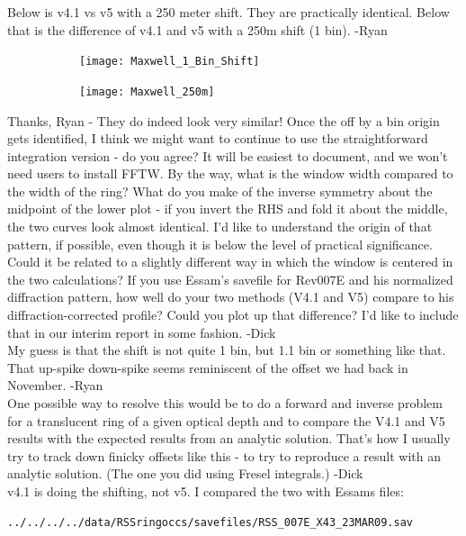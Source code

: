 \documentclass[crop=false,class=article,oneside]{standalone}
\begin{document}
Below is v4.1 vs v5 with a 250 meter shift. They are practically identical. Below that is the difference of v4.1 and v5 with a 250m shift (1 bin). -Ryan
\begin{figure}[H]
    \centering
    \begin{subfigure}[b]{0.49\textwidth}
        \texttt{[image: Maxwell\_1\_Bin\_Shift]}
    \end{subfigure}
        \begin{subfigure}[b]{0.49\textwidth}
        \texttt{[image: Maxwell\_250m]}
    \end{subfigure}
\end{figure}
Thanks, Ryan - They do indeed look very similar! Once the off by a bin origin gets identified, I think we might want to continue to use the straightforward integration version - do you agree? It will be easiest to document, and we won't need users to install FFTW. By the way, what is the window width compared to the width of the ring? What do you make of the inverse symmetry about the midpoint of the lower plot - if you invert the RHS and fold it about the middle, the two curves look almost identical. I'd like to understand the origin of that pattern, if possible, even though it is below the level of practical significance. Could it be related to a slightly different way in which the window is centered in the two calculations? If you use Essam's savefile for Rev007E and his normalized diffraction pattern, how well do your two methods (V4.1 and V5) compare to his diffraction-corrected profile? Could you plot up that difference? I'd like to include that in our interim report in some fashion. -Dick\\
My guess is that the shift is not quite 1 bin, but 1.1 bin or something like that. That up-spike down-spike seems reminiscent of the offset we had back in November. -Ryan\\
One possible way to resolve this would be to do a forward and inverse problem for a translucent ring of a given optical depth and to compare the V4.1 and V5 results with the expected results from an analytic solution. That's how I usually try to track down finicky offsets like this - to try to reproduce a result with an analytic solution. (The one you did using Fresel integrals.) -Dick\\
v4.1 is doing the shifting, not v5. I compared the two with Essams files:
\begin{lstlisting}[language=bash]
../../../../data/RSSringoccs/savefiles/RSS_007E_X43_23MAR09.sav
\end{lstlisting}
\end{document}
